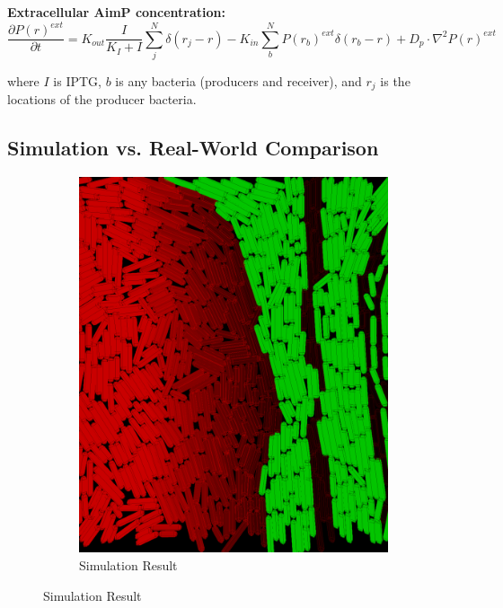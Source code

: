 \documentclass[11pt,a4paper]{article}
\begin{document}
\textbf{Extracellular AimP concentration:}
\begin{equation}
    \frac{\partial P(r)^{ext}}{\partial t} = K_{out} \frac{I}{K_{I} + I} \sum_{j}^{N} \delta(r_j - r)  - K_{in} \sum_{b}^{N} P(r_b)^{ext}\delta(r_b - r)+ D_p \cdot \nabla^2 P(r)^{ext}
\end{equation}

where $I$ is IPTG, $b$ is any bacteria (producers and receiver), and $r_j$ is the locations of the producer bacteria.

\subsection{Simulation vs. Real-World Comparison}

\begin{figure}[H]
    \centering
    \begin{subfigure}[b]{0.45\textwidth}
        \centering
        \includegraphics[width=\textwidth]{../figures/monDecSim.png}
        \caption{Simulation Result}
        \label{fig:mono_dec_sim}
    \end{subfigure}

\end{figure}
\end{document}
